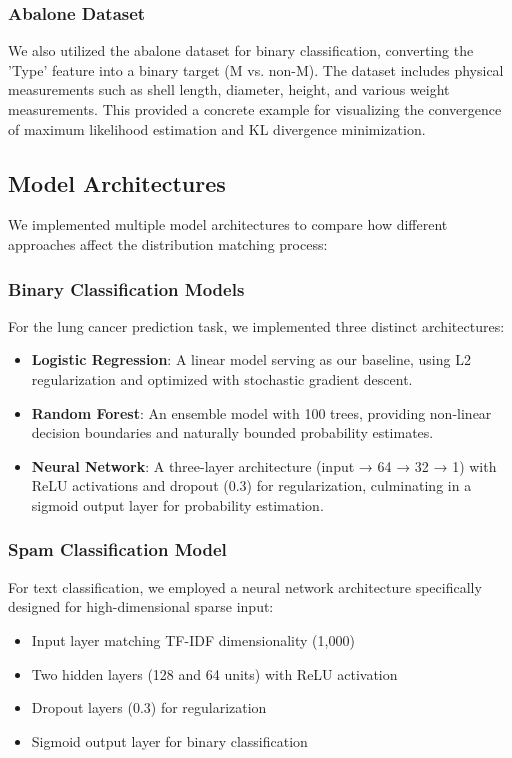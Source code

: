 \documentclass[preprint,12pt]{elsarticle}
\begin{document}
\subsubsection{Abalone Dataset}
We also utilized the abalone dataset for binary classification, converting the 'Type' feature into a binary target (M vs. non-M). The dataset includes physical measurements such as shell length, diameter, height, and various weight measurements. This provided a concrete example for visualizing the convergence of maximum likelihood estimation and KL divergence minimization.


\subsection{Model Architectures}
We implemented multiple model architectures to compare how different approaches affect the distribution matching process:

\subsubsection{Binary Classification Models}
For the lung cancer prediction task, we implemented three distinct architectures:
\begin{itemize}
    \item \textbf{Logistic Regression}: A linear model serving as our baseline, using L2 regularization and optimized with stochastic gradient descent.
    
    \item \textbf{Random Forest}: An ensemble model with 100 trees, providing non-linear decision boundaries and naturally bounded probability estimates.
    
    \item \textbf{Neural Network}: A three-layer architecture (input → 64 → 32 → 1) with ReLU activations and dropout (0.3) for regularization, culminating in a sigmoid output layer for probability estimation.
\end{itemize}

\subsubsection{Spam Classification Model}
For text classification, we employed a neural network architecture specifically designed for high-dimensional sparse input:
\begin{itemize}
    \item Input layer matching TF-IDF dimensionality (1,000)
    \item Two hidden layers (128 and 64 units) with ReLU activation
    \item Dropout layers (0.3) for regularization
    \item Sigmoid output layer for binary classification
\end{itemize}
\end{document}
